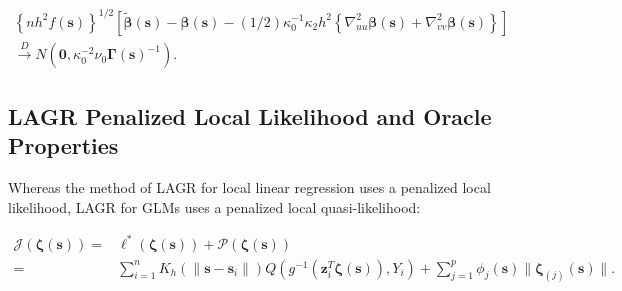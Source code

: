 \documentclass[authoryear,review, 12pt]{elsarticle}
\begin{document}
\begin{gather*}
\left\{ nh^{2}f(\bm{s})\right\} ^{1/2}\left[\tilde{\bm{\beta}}(\bm{s})-\bm{\beta}(\bm{s})-(1/2)\kappa_{0}^{-1}\kappa_{2}h^{2}\left\{ \nabla_{uu}^{2}\bm{\beta}(\bm{s})+\nabla_{vv}^{2}\bm{\beta}(\bm{s})\right\} \right]\\
\xrightarrow{{D}}N\left(\bm{0},\kappa_{0}^{-2}\nu_{0}\bm{\Gamma}(\bm{s})^{-1}\right).
\end{gather*}



\subsection{LAGR Penalized Local Likelihood and Oracle Properties}

Whereas the method of LAGR for local linear regression uses a penalized
local likelihood, LAGR for GLMs uses a penalized local quasi-likelihood:

\begin{align*}
\mathcal{J}\left(\bm{\zeta}(\bm{s})\right)= & \mathcal{\ell}^{*}\left(\bm{\zeta}(\bm{s})\right)+\mathcal{P}\left(\bm{\zeta}(\bm{s})\right)\\
= & \sum_{i=1}^{n}K_{h}\left(\|\bm{s}-\bm{s}_{i}\|\right)Q\left(g^{-1}\left(\bm{z}_{i}^{T}\bm{\zeta}(\bm{s})\right),Y_{i}\right)+\sum_{j=1}^{p}\phi_{j}(\bm{s})\|\bm{\zeta}_{(j)}(\bm{s})\|.
\end{align*}
\end{document}
